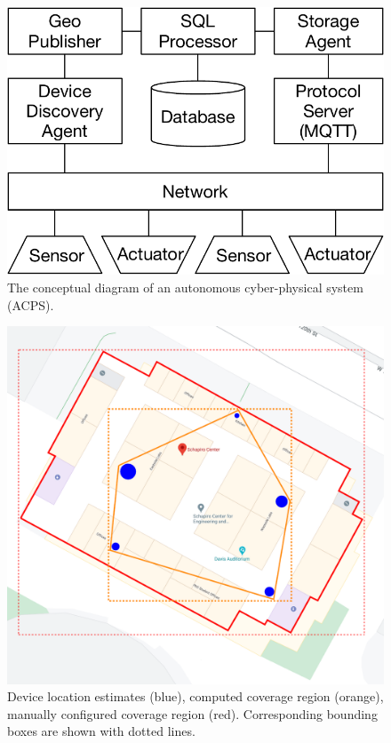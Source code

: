 \begin{figure}
    \centering
    \includegraphics[width=0.8\linewidth]{figs/acps.pdf}%
    \caption{The conceptual diagram of an autonomous cyber-physical system (ACPS).}\label{fig:acps}%
\end{figure}

\begin{figure}
    \centering
    \includegraphics[width=1\linewidth]{figs/acps-coverage.png}%
    \caption{Device location estimates (blue), computed coverage region (orange), manually configured coverage region (red). Corresponding bounding boxes are shown with dotted lines.}\label{fig:acps-coverage}%
\end{figure}



